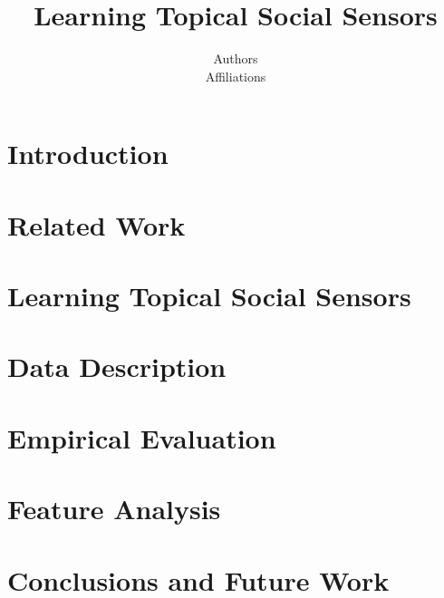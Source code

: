 \documentclass[letterpaper]{article}
\begin{document}
%
\title{Learning Topical Social Sensors}
\author{Authors\\
Affiliations
}
\maketitle
\begin{abstract}

\end{abstract}

\section{Introduction}


\section{Related Work}


\section{Learning Topical Social Sensors}
\label{sec:lss}


\section{Data Description}


\section{Empirical Evaluation}
\label{sec:methodology}


\section{Feature Analysis}
\label{label:featureanalysis}


\section{Conclusions and Future Work}


%
%



\end{document}
